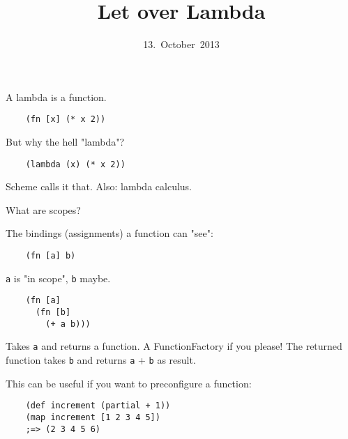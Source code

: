 

\title{Let over Lambda}
\date{13.~October~2013}



\frame{\titlepage}


\begin{frame}[fragile]
  \begin{center}
    A lambda is a function.
  \end{center}
  \pause
  \begin{verbatim}
    (fn [x] (* x 2))
  \end{verbatim}
\end{frame}

\begin{frame}[fragile]
  \begin{center}
    But why the hell "lambda"?
  \end{center}
  \begin{verbatim}
    (lambda (x) (* x 2))
  \end{verbatim}
  \begin{center}
    Scheme calls it that. Also: lambda calculus.
  \end{center}
\end{frame}

\begin{frame}[fragile]
  What are scopes?

  \pause
  The bindings (assignments) a function can "see":

  \begin{verbatim}
    (fn [a] b)
  \end{verbatim}

  \texttt{a} is "in scope", \texttt{b} maybe.
\end{frame}


\begin{frame}[fragile]
  \begin{verbatim}
    (fn [a]
      (fn [b]
        (+ a b)))
  \end{verbatim}
  Takes \texttt{a} and returns a function. A FunctionFactory if you please!
  The returned function takes \texttt{b} and returns \texttt{a} + \texttt{b}
  as result.
\end{frame}

\begin{frame}[fragile]
  This can be useful if you want to preconfigure a function:
  \begin{verbatim}
    (def increment (partial + 1))
    (map increment [1 2 3 4 5])
    ;=> (2 3 4 5 6)
  \end{verbatim}
\end{frame}



